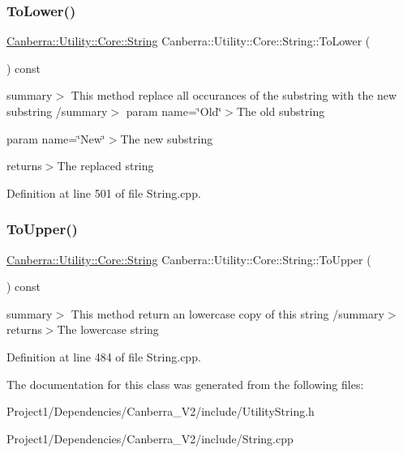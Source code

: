 \subsubsection{\texorpdfstring{To\+Lower()}{ToLower()}}
{\footnotesize\ttfamily \hyperlink{class_canberra_1_1_utility_1_1_core_1_1_string}{Canberra\+::\+Utility\+::\+Core\+::\+String} Canberra\+::\+Utility\+::\+Core\+::\+String\+::\+To\+Lower (\begin{DoxyParamCaption}{ }\end{DoxyParamCaption}) const}

summary$>$ This method replace all occurances of the substring with the new substring /summary$>$ param name=\char`\"{}\+Old\char`\"{}$>$The old substring

param name=\char`\"{}\+New\char`\"{}$>$The new substring

returns$>$The replaced string

Definition at line 501 of file String.\+cpp.

\mbox{\label{class_canberra_1_1_utility_1_1_core_1_1_string_aaec177c997a9bffbe90e4c5150802d9c_aaec177c997a9bffbe90e4c5150802d9c}} 
\subsubsection{\texorpdfstring{To\+Upper()}{ToUpper()}}
{\footnotesize\ttfamily \hyperlink{class_canberra_1_1_utility_1_1_core_1_1_string}{Canberra\+::\+Utility\+::\+Core\+::\+String} Canberra\+::\+Utility\+::\+Core\+::\+String\+::\+To\+Upper (\begin{DoxyParamCaption}{ }\end{DoxyParamCaption}) const}

summary$>$ This method return an lowercase copy of this string /summary$>$ returns$>$The lowercase string

Definition at line 484 of file String.\+cpp.



The documentation for this class was generated from the following files\+:\begin{DoxyCompactItemize}
\item 
Project1/\+Dependencies/\+Canberra\+\_\+\+V2/include/Utility\+String.\+h\item 
Project1/\+Dependencies/\+Canberra\+\_\+\+V2/include/String.\+cpp\end{DoxyCompactItemize}
